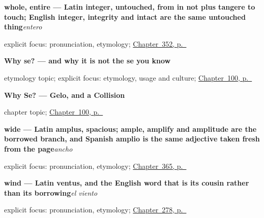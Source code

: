 \noindent\begin{minipage}[t]{\linewidth}
\raggedright
\textbf{whole, entire — Latin integer, untouched, from in not plus tangere to touch; English integer, integrity and intact are the same untouched thing}\enspace\emph{entero}\par
\footnotesize explicit focus: pronunciation, etymology; \hyperref[ch:el-conjunto-y-el-resto]{Chapter~352, p.~\pageref*{ch:el-conjunto-y-el-resto}}
\end{minipage}\par\smallskip

\noindent\begin{minipage}[t]{\linewidth}
\raggedright
\textbf{Why se? — and why it is not the se you know}\par
\footnotesize etymology topic; explicit focus: etymology, usage and culture; \hyperref[ch:etymon-gelo]{Chapter~100, p.~\pageref*{ch:etymon-gelo}}
\end{minipage}\par\smallskip

\noindent\begin{minipage}[t]{\linewidth}
\raggedright
\textbf{Why Se? --- Gelo, and a Collision}\par
\footnotesize chapter topic; \hyperref[ch:etymon-gelo]{Chapter~100, p.~\pageref*{ch:etymon-gelo}}
\end{minipage}\par\smallskip

\noindent\begin{minipage}[t]{\linewidth}
\raggedright
\textbf{wide — Latin amplus, spacious; ample, amplify and amplitude are the borrowed branch, and Spanish amplio is the same adjective taken fresh from the page}\enspace\emph{ancho}\par
\footnotesize explicit focus: pronunciation, etymology; \hyperref[ch:alto-y-largo]{Chapter~365, p.~\pageref*{ch:alto-y-largo}}
\end{minipage}\par\smallskip

\noindent\begin{minipage}[t]{\linewidth}
\raggedright
\textbf{wind — Latin ventus, and the English word that is its cousin rather than its borrowing}\enspace\emph{el viento}\par
\footnotesize explicit focus: pronunciation, etymology; \hyperref[ch:al-aire-libre]{Chapter~278, p.~\pageref*{ch:al-aire-libre}}
\end{minipage}\par\smallskip


